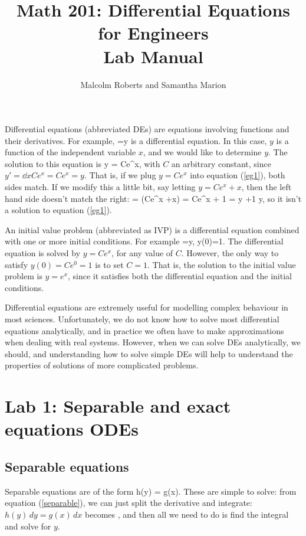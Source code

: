 \documentclass[12pt]{article}
\title{Math 201: Differential Equations for Engineers\\Lab Manual}
\author{Malcolm Roberts and Samantha Marion}
\begin{document}
\maketitle

Differential equations (abbreviated DEs) are equations involving functions and 
their derivatives. For example, 
\be \label{eg1}
 =y
\ee
is a differential equation. In this case, $y$ is a function of the independent 
variable $x$, and we would like to determine $y$. The solution to this
equation is
\be
y = Ce^x,
\ee
with $C$ an arbitrary constant, since $y'=\dd{}{x}Ce^x=Ce^x=y$. That is, if we 
plug $y=Ce^x$ into equation (\ref{eg1}), both sides match. If we modify this
a little bit, say letting $y=Ce^x +x$, then the left hand side doesn't
match the right:
\be
{} = (Ce^x +x) = Ce^x + 1 = y +1 \neq y,
\ee
so it isn't a solution to equation (\ref{eg1}).

An initial value problem (abbreviated as IVP) is a differential equation 
combined with one or more initial conditions. For example
\be
{}=y, \qquad y(0)=1.
\ee
The differential equation is solved by $y=Ce^x$, for any value of $C$. However,
the only way to satisfy $y(0)=Ce^0=1$ is to set $C=1$. That is, the solution
to the initial value problem is $y=e^x$, since it satisfies both the 
differential equation and the initial conditions.

Differential equations are extremely useful for modelling complex behaviour in 
most sciences. Unfortunately, we do not know how to solve most
differential equations analytically, and in practice we often have to 
make approximations when dealing with real systems. However, when we can solve
DEs analytically, we should, and understanding how to solve simple DEs will
help to understand the properties of solutions of more complicated problems.

\newpage

\section{Lab 1: Separable and exact equations ODEs}


\subsection{Separable equations}

Separable equations are of the form
\be \label{separable}
  h(y)  = g(x).
\ee
These are simple to solve: from equation (\ref{separable}), we can just split
the derivative and integrate: $ h(y)\, dy = g(x) \, dx$ becomes
\be 
{},
\ee
and then all we need to do is find the integral and solve for $y$.\\
\end{document}
